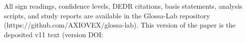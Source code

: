 \documentclass[11pt]{article}
\begin{document}
All sign readings, confidence levels, DEDR citations, basis statements, analysis scripts, and study reports are available in the Glossa-Lab repository (https://github.com/AXIOVEX/glossa-lab). This version of the paper is the deposited v11 text (version DOI: %
\end{document}
